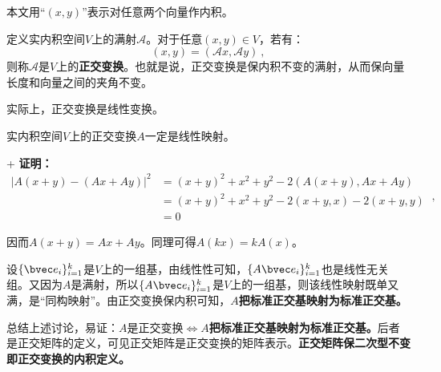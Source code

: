 
本文用“$(x,y)$”表示对任意两个向量作内积。
\begin{definition}{}
定义实内积空间$V$上的满射$\mathcal A$。对于任意$(x,y)\in V$，若有：
\begin{equation}
(x,y)=(\mathcal A x,\mathcal A y)~,
\end{equation}
则称$\mathcal A$是$V$上的\textbf{正交变换}。也就是说，正交变换是保内积不变的满射，从而保向量长度和向量之间的夹角不变。
\end{definition}
实际上，正交变换是线性变换。
\begin{theorem}{}
实内积空间$V$上的正交变换$A$一定是线性映射。
\end{theorem}+
\textbf{证明：}
\begin{equation}
\begin{aligned}
|A(x+y)-(Ax+Ay)|^2&=(x+y)^2+x^2+y^2-2\left(A(x+y),Ax+Ay\right)\\
&=(x+y)^2+x^2+y^2-2(x+y,x)-2(x+y,y)\\
&=0
\end{aligned}
~,\end{equation}

因而$A(x+y)=Ax+Ay$。同理可得$A(kx)=kA(x)$。

设$\{\bvec e_i\}^k_{i=1}$是$V$上的一组基，由线性性可知，$\{A\bvec e_i\}^k_{i=1}$也是线性无关组。又因为$A$是满射，所以$\{A\bvec e_i\}^k_{i=1}$是$V$上的一组基，则该线性映射既单又满，是“同构映射”。由正交变换保内积可知，$A$\textbf{把标准正交基映射为标准正交基。}

总结上述讨论，易证：$A$是正交变换$\Longleftrightarrow A$\textbf{把标准正交基映射为标准正交基。}后者是正交矩阵的定义，可见正交矩阵是正交变换的矩阵表示。\textbf{正交矩阵保二次型不变即正交变换的内积定义。}



